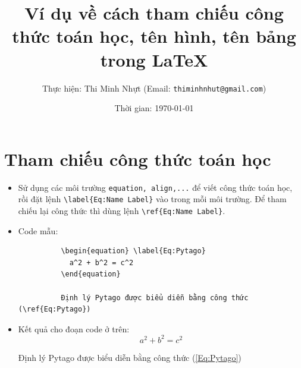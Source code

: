 \documentclass[12pt,a4paper]{article}
\title{Ví dụ về cách tham chiếu công thức toán học, tên hình, tên bảng trong \LaTeX}
\author{Thực hiện: Thi Minh Nhựt (Email: \texttt{thiminhnhut@gmail.com})}
\date{Thời gian: \today}
\begin{document}
  \maketitle

  \section{Tham chiếu công thức toán học}
    \begin{itemize}
      \item Sử dụng các môi trường \verb|equation, align,...| để viết công thức toán học, rồi đặt lệnh \verb|\label{Eq:Name Label}| vào trong mỗi môi trường. Để tham chiếu lại công thức thì dùng lệnh \verb|\ref{Eq:Name Label}|.
      \item Code mẫu:
        \begin{verbatim}
          \begin{equation} \label{Eq:Pytago}
            a^2 + b^2 = c^2
          \end{equation}
    
          Định lý Pytago được biểu diễn bằng công thức (\ref{Eq:Pytago})
        \end{verbatim}
      \item Kết quả cho đoạn code ở trên:
        \begin{equation} \label{Eq:Pytago}
          a^2 + b^2 = c^2
        \end{equation}

        Định lý Pytago được biểu diễn bằng công thức (\ref{Eq:Pytago})
    \end{itemize}
\end{document}
